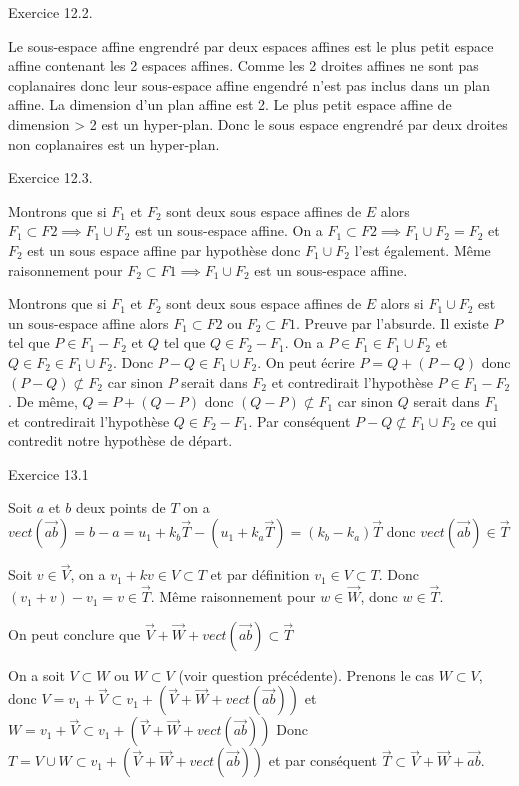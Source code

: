 \documentclass[]{book}
\theoremstyle{definition}
\begin{document}
Exercice 12.2.

Le sous-espace affine engrendr\'e par deux espaces affines est le plus petit espace affine contenant les 2 espaces affines. Comme les 2 droites affines ne sont pas coplanaires donc leur sous-espace affine engendré n'est pas inclus dans un plan affine. La dimension d'un plan affine est 2. Le plus petit espace affine de dimension > 2 est un hyper-plan. Donc le sous espace engrendr\'e par deux droites non coplanaires est un hyper-plan.


Exercice 12.3.

Montrons que si $F_1$ et $F_2$ sont deux sous espace affines de $E$ alors $F_1 \subset F2 \implies F_1 \cup F_2$ est un sous-espace affine. On a $F_1 \subset F2 \implies F_1 \cup F_2 = F_2$ et $F_2$ est un sous espace affine par hypoth\`ese donc $F_1 \cup F_2$ l'est \'egalement. M\^eme raisonnement pour $F_2 \subset F1 \implies F_1 \cup F_2$ est un sous-espace affine.

Montrons que si $F_1$ et $F_2$ sont deux sous espace affines de $E$ alors si $F_1 \cup F_2$ est un sous-espace affine alors $F_1 \subset F2$ ou $F_2 \subset F1$. Preuve par l'absurde. Il existe $P$ tel que $P \in F_1 - F_2$ et $Q$ tel que $Q \in F_2 - F_1$. On a $P \in F_1 \in F_1 \cup F_2$ et $Q \in F_2 \in F_1 \cup F_2$. Donc $P-Q \in F_1 \cup F_2$.
On peut \'ecrire $P = Q + (P-Q)$ donc $(P-Q) \not \subset F_2$ car sinon $P$ serait dans $F_2$ et contredirait l'hypoth\`ese $P \in F_1 - F_2$. De m\^eme, $Q = P + (Q-P)$ donc $(Q-P) \not \subset F_1$ car sinon $Q$ serait dans $F_1$ et contredirait l'hypoth\`ese $Q \in F_2 - F_1$. Par cons\'equent $P-Q \not \subset F_1 \cup F_2$ ce qui contredit notre hypoth\`ese de d\'epart.


Exercice 13.1

Soit $a$ et $b$ deux points de $T$ on a $vect(\overrightarrow{ab}) = b - a = u_1 + k_b\overrightarrow{T} - (u_1 + k_a \overrightarrow{T}) = (k_b-k_a) \overrightarrow{T}$ donc $vect(\overrightarrow{ab}) \in \overrightarrow{T}$

Soit $v \in \overrightarrow{V}$, on a $v_1 + k v \in V \subset T$ et par d\'efinition $v_1 \in V \subset T$. Donc $(v_1+v) - v_1 = v \in \overrightarrow{T}$. M\^eme raisonnement pour $w \in \overrightarrow{W}$, donc $w \in \overrightarrow{T}$.

On peut conclure que $\overrightarrow{V} + \overrightarrow{W} + vect(\overrightarrow{ab}) \subset \overrightarrow{T}$

On a soit $V \subset W$ ou $W \subset V$ (voir question pr\'ec\'edente). Prenons le cas $W \subset V$, donc $V = v_1 + \overrightarrow{V} \subset v_1 + (\overrightarrow{V} + \overrightarrow{W} + vect(\overrightarrow{ab})) $ et $W = v_1 + \overrightarrow{V} \subset v_1 + (\overrightarrow{V} + \overrightarrow{W} + vect(\overrightarrow{ab}))$ Donc $T = V \cup W \subset v_1 + (\overrightarrow{V} + \overrightarrow{W} + vect(\overrightarrow{ab}))$ et par cons\'equent $\overrightarrow{T} \subset \overrightarrow{V} + \overrightarrow{W} + \overrightarrow{ab}$.
\end{document}
